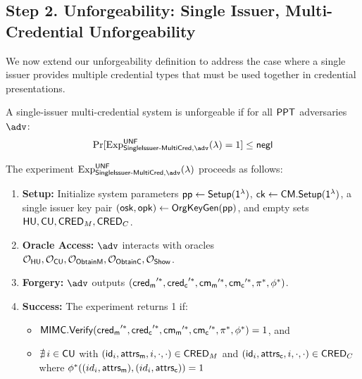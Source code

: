 \newpage
\subsection{Step 2. Unforgeability: Single Issuer, Multi-Credential Unforgeability}

We now extend our unforgeability definition to address the case where a single issuer provides multiple credential types that must be used together in credential presentations.

\begin{definition}
A single-issuer multi-credential system is unforgeable if for all $\mathsf{PPT}$ adversaries $\adv$:
\[
\Pr[\mathrm{Exp}^{\mathsf{UNF}}_{\mathsf{SingleIssuer\text{-}MultiCred}, \adv}(\lambda) = 1] \leq \negl
\]
\end{definition}

\noindent The experiment $\mathrm{Exp}^{\mathsf{UNF}}_{\mathsf{SingleIssuer\text{-}MultiCred}, \adv}(\lambda)$ proceeds as follows:

\begin{enumerate}
    \item \textbf{Setup:} Initialize system parameters $\mathsf{pp} \gets \mathsf{Setup}(\mathsf{1^{\lambda}})$, $\mathsf{ck} \gets \mathsf{CM.Setup}(\mathsf{1^{\lambda}})$, a single issuer key pair $(\mathsf{osk}, \mathsf{opk}) \gets \mathsf{OrgKeyGen}(\mathsf{pp})$, and empty sets $\mathsf{HU}, \mathsf{CU}, \mathsf{CRED}_M, \mathsf{CRED}_C$.
    
    \item \textbf{Oracle Access:} $\adv$ interacts with oracles $\mathcal{O}_{\mathsf{HU}}, \mathcal{O}_{\mathsf{CU}}, \mathcal{O}_{\mathsf{ObtainM}}, \mathcal{O}_{\mathsf{ObtainC}}, \mathcal{O}_{\mathsf{Show}}$.
    
    \item \textbf{Forgery:} $\adv$ outputs $(\mathsf{cred_m}'^*, \mathsf{cred_c}'^*, \mathsf{cm_m}'^*, \mathsf{cm_c}'^*, \pi^*, \phi^*)$.
    
    \item \textbf{Success:} The experiment returns 1 if:
    \begin{itemize}
        \item $\mathsf{MIMC.Verify}(\mathsf{cred_m}'^*, \mathsf{cred_c}'^*, \mathsf{cm_m}'^*, \mathsf{cm_c}'^*, \pi^*, \phi^*) = 1$, and
        \item $\nexists\, i \in \mathsf{CU}$ with $(\mathsf{id}_i, \mathsf{attrs_m}, i, \cdot, \cdot) \in \mathsf{CRED}_M$ and $(\mathsf{id}_i, \mathsf{attrs_c}, i, \cdot, \cdot) \in \mathsf{CRED}_C$ where $\phi^*((id_i, \mathsf{attrs_m}), (id_i, \mathsf{attrs_c})) = 1$
    \end{itemize}
\end{enumerate}

